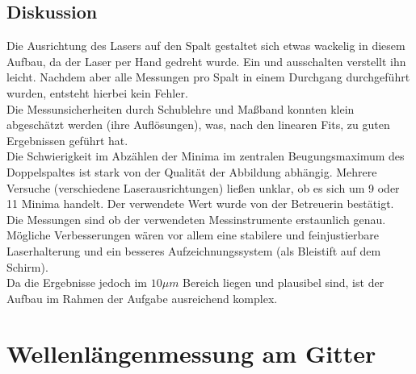 \documentclass[12pt,a4paper]{article}
\begin{document}
\begin{multicols}{2}
\subsection{Diskussion}
Die Ausrichtung des Lasers auf den Spalt gestaltet sich etwas wackelig in diesem Aufbau, da der Laser per Hand gedreht wurde. Ein und ausschalten verstellt ihn leicht. Nachdem aber alle Messungen pro Spalt in einem Durchgang durchgeführt wurden, entsteht hierbei kein Fehler.\\
Die Messunsicherheiten durch Schublehre und Maßband konnten klein abgeschätzt werden (ihre Auflösungen), was, nach den linearen Fits, zu guten Ergebnissen geführt hat.\\
Die Schwierigkeit im Abzählen der Minima im zentralen Beugungsmaximum des Doppelspaltes ist stark von der Qualität der Abbildung abhängig. Mehrere Versuche (verschiedene Laserausrichtungen) ließen unklar, ob es sich um 9 oder 11 Minima handelt. Der verwendete Wert wurde von der Betreuerin bestätigt.\\
Die Messungen sind ob der verwendeten Messinstrumente erstaunlich genau. Mögliche Verbesserungen wären vor allem eine stabilere und feinjustierbare Laserhalterung und ein besseres Aufzeichnungssystem (als Bleistift auf dem Schirm).\\
Da die Ergebnisse jedoch im $10 \mu m$ Bereich liegen und plausibel sind, ist der Aufbau im Rahmen der Aufgabe ausreichend komplex.

\pagebreak
\section{Wellenlängenmessung am Gitter}


\end{multicols}
\end{document}

